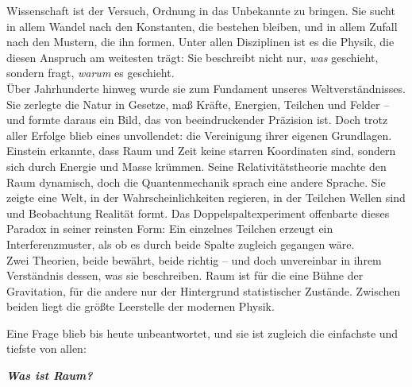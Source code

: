 Wissenschaft ist der Versuch, Ordnung in das Unbekannte zu bringen.  
Sie sucht in allem Wandel nach den Konstanten, die bestehen bleiben,  
und in allem Zufall nach den Mustern, die ihn formen.  
Unter allen Disziplinen ist es die Physik,  
die diesen Anspruch am weitesten trägt:  
Sie beschreibt nicht nur, \emph{was} geschieht,  
sondern fragt, \emph{warum} es geschieht.  
\\
\noindent
Über Jahrhunderte hinweg wurde sie zum Fundament unseres Weltverständnisses.  
Sie zerlegte die Natur in Gesetze,  
maß Kräfte, Energien, Teilchen und Felder –  
und formte daraus ein Bild, das von beeindruckender Präzision ist.  
Doch trotz aller Erfolge blieb eines unvollendet:  
die Vereinigung ihrer eigenen Grundlagen.
\\
\noindent
Einstein erkannte, dass Raum und Zeit keine starren Koordinaten sind,  
sondern sich durch Energie und Masse krümmen.  
Seine Relativitätstheorie machte den Raum dynamisch,  
doch die Quantenmechanik sprach eine andere Sprache.  
Sie zeigte eine Welt, in der Wahrscheinlichkeiten regieren,  
in der Teilchen Wellen sind und Beobachtung Realität formt.  
Das Doppelspaltexperiment offenbarte dieses Paradox in seiner reinsten Form:  
Ein einzelnes Teilchen erzeugt ein Interferenzmuster,  
als ob es durch beide Spalte zugleich gegangen wäre.
\\
\noindent
Zwei Theorien, beide bewährt, beide richtig –  
und doch unvereinbar in ihrem Verständnis dessen,  
was sie beschreiben.  
Raum ist für die eine Bühne der Gravitation,  
für die andere nur der Hintergrund statistischer Zustände.  
Zwischen beiden liegt die größte Leerstelle der modernen Physik.
\noindent
\begin{center}
Eine Frage blieb bis heute unbeantwortet,  
und sie ist zugleich die einfachste und tiefste von allen:  
\end{center}

\vspace{2cm}
\begin{center}
    {\huge\textbf\emph{Was ist Raum?}}
\end{center}